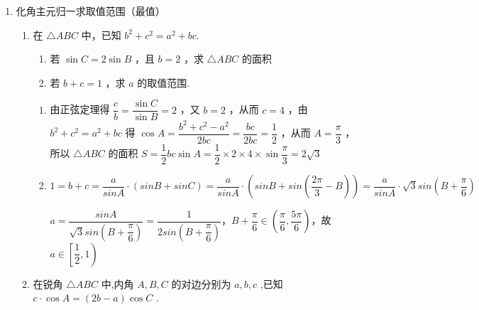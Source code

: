 \begin{enumerate}
\begin{enumerate}
\begin{jieda}
\begin{enumerate}
            \item 由正弦定理得， $a = 4\sin A$ ， $c = 4\sin \left( {{60}^{ \circ  } - A}\right)$ ，所以 $\bigtriangleup {ABC}$ 的周长为 $a + b + c = 4\sin A + 4\sin \left( {{60}^{ \circ  } - A}\right)  + 2\sqrt{3} =  4\sin \left( {A + {60}^{ \circ  }}\right)  + 2\sqrt{3},{0}^{ \circ  } < A < {60}^{ \circ  }$ ,当 $A = {30}^{ \circ  }$ 时, $\bigtriangleup {ABC}$ 的周长的最大值为 $4 + 2\sqrt{3}$.
        \end{enumerate}
    \end{jieda}
\end{enumerate}
\item 化角主元归一求取值范围（最值）
\begin{enumerate}
    \item 在 $\bigtriangleup  {ABC}$ 中，已知 ${b}^{2} + {c}^{2} = {a}^{2} + {bc}$.
    \begin{enumerate}
        \item 若 $\sin C = {2\sin B}$ ，且 $b = 2$ ，求 $\bigtriangleup  {ABC}$ 的面积
        \item 若 $b + c = 1$ ，求 $a$ 的取值范围.
    \end{enumerate}
    \begin{jieda}
        \begin{enumerate}
            \item 由正弦定理得 $\dfrac{c}{b} = \dfrac{\sin C}{\sin B} = 2$ ，又 $b = 2$ ，从而 $c = 4$ ，由 ${b}^{2} + {c}^{2} = {a}^{2} + {bc}$ 得 $\cos A = \dfrac{{b}^{2} + {c}^{2} - {a}^{2}}{2bc} = \dfrac{bc}{2bc} = \dfrac{1}{2}$ ，从而 $A = \dfrac{\pi }{3}$ ， 所以 $\bigtriangleup {ABC}$ 的面积 $S = \dfrac{1}{2}{bc}\sin A = \dfrac{1}{2} \times  2 \times  4 \times  \sin \dfrac{\pi }{3} = 2\sqrt{3}$
            \item $1 = b + c = \dfrac{a}{sinA} \cdot (sinB + sinC) = \dfrac{a}{sinA} \cdot \left(sinB + sin\left(\dfrac{2\pi}{3} - B\right)\right) = \dfrac{a}{sinA} \cdot \sqrt{3}sin\left(B + \dfrac{\pi}{6}\right)$
            
            $a = \dfrac{sinA}{\sqrt{3}sin\left(B + \dfrac{\pi}{6}\right)} = \dfrac{1}{2sin\left(B + \dfrac{\pi}{6}\right)}$，$B+\dfrac{\pi}{6} \in \left(\dfrac{\pi}{6}, \dfrac{5\pi}{6}\right)$，故$a \in \left[\dfrac{1}{2}, 1\right)$
        \end{enumerate}
    \end{jieda}

    \item  在锐角 $\bigtriangleup  {ABC}$ 中,内角 $A,B,C$ 的对边分别为 $a,b,c$ ,已知 $c \cdot  \cos A = \left( {{2b} - a}\right) \cos C$ .
    

\end{enumerate}
\end{enumerate}
